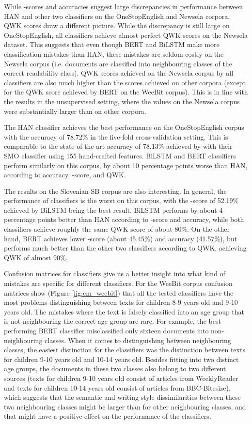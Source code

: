 \documentclass{clv3}
\begin{document}
While -scores and accuracies suggest large discrepancies in performance between HAN and other two classifiers on the OneStopEnglish and Newsela corpora, QWK scores draw a different picture. While the discrepancy is still large on OneStopEnglish, all classifiers achieve almost perfect QWK scores on the Newsela dataset. This suggests that even though BERT and BiLSTM make more classification mistakes than HAN, these mistakes are seldom costly on the Newsela corpus (i.e. documents are classified into neighbouring classes of the correct readability class). QWK scores achieved on the Newsela corpus by all classifiers are also much higher than the scores achieved on other corpora (except for the QWK score achieved by BERT on the WeeBit corpus). This is in line with the results in the unsupervised setting, where the  values on the Newsela corpus were substantially larger than on other corpora.    

The HAN classifier achieves the best performance on the OneStopEnglish corpus with the accuracy of 78.72\% in the five-fold cross-validation setting. This is comparable to the state-of-the-art accuracy of 78.13\% achieved by \citet{vajjala2018onestopenglish} with their SMO classifier using 155 hand-crafted features. BiLSTM and BERT classifiers perform similarly on this corpus, by about 10 percentage points worse than HAN, according to accuracy, -score, and QWK. 

The results on the  Slovenian SB corpus are also interesting. In general, the performance of classifiers is the worst on this corpus, with the -score of 52.19\% achieved by BiLSTM being the best result. BiLSTM performs by about 4 percentage points better than HAN according to -score and accuracy, while both classifiers achieve roughly the same QWK score of about 80\%. On the other hand, BERT achieves lower -score (about 45.45\%) and accuracy (41.57\%), but performs much better than the other two classifiers according to QWK, achieving QWK of almost 90\%. 

Confusion matrices for classifiers give us a better insight into what kind of mistakes are specific for different classifiers. For the WeeBit corpus confusion matrices show (Figure \ref{fig:cm_weebit}) that all the tested classifiers have the most problems distinguishing between texts for children 8-9 years old and 9-10 years old. The mistakes where the text is falsely classified into an age group that is not neighbouring the correct age group are rare. For example, the best performing BERT classifier misclassified only sixteen documents into non-neighbouring classes. When it comes to distinguishing between neighbouring classes, the easiest distinction for the classifiers was the distinction between texts for children 9-10 years old and 10-14 years old. Besides fitting into two distinct age groups, the documents in these two classes also belong to two different sources (texts for children 9-10 years old consist of articles from WeeklyReader and texts for children 10-14 years old consist of articles from BBC-Bitesize), which suggests that the semantic and writing style dissimilarities between these two neighbouring classes might be larger than for other neighbouring classes, and that might have a positive effect on the performance of the classifiers.
\end{document}
